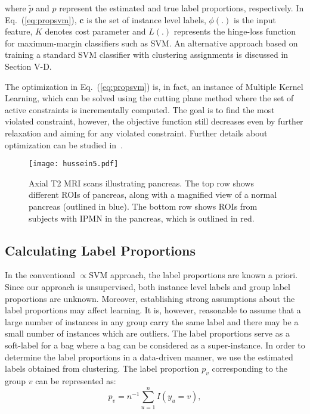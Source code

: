 \documentclass[journal]{IEEEtran}
\begin{document}
\noindent where $\widetilde{p}$ and $p$ represent the estimated and true label proportions, respectively. In Eq.~(\ref{eq:propsvm}), $\mathbf{c}$ is the set of instance level labels, $\phi(.)$ is the input feature, $K$ denotes cost parameter and $L(.)$ represents the hinge-loss function for maximum-margin classifiers such as SVM. An alternative approach based on training a standard SVM classifier with clustering assignments is discussed in Section V-D.

The optimization in Eq.~(\ref{eq:propsvm}) is, in fact, an instance of Multiple Kernel Learning, which can be solved using the cutting plane method where the set of active constraints is incrementally computed. The goal is to find the most violated constraint, however, the objective function still decreases even by further relaxation and aiming for any violated constraint. Further details about optimization can be studied in~\cite{yu2013propto}.

\begin{figure*}[t]
\centering
\texttt{[image: hussein5.pdf]}
\caption{Axial T2 MRI scans illustrating pancreas. The top row shows different ROIs of pancreas, along with a magnified view of a normal pancreas (outlined in blue). The bottom row shows ROIs from subjects with IPMN in the pancreas, which is outlined in red.}
\label{fig:IPMN}
\end{figure*}

\subsection{Calculating Label Proportions}
In the conventional $\propto$SVM approach, the label proportions are known a priori. Since our approach is unsupervised, both instance level labels and group label proportions are unknown. Moreover, establishing strong assumptions about the label proportions may affect learning. It is, however, reasonable to assume that a large number of instances in any group carry the same label and there may be a small number of instances which are outliers. The label proportions serve as a soft-label for a bag where a bag can be considered as a super-instance. In order to determine the label proportions in a data-driven manner, we use the estimated labels obtained from clustering. The label proportion $p_v$ corresponding to the group $v$ can be represented as:
\begin{equation}
p_{v}=n^{-1} \sum_{u=1}^{n}I(y_u=v),
\label{eq:label}
\end{equation}
\end{document}
